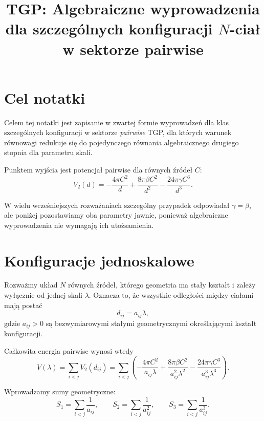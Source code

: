 \documentclass[11pt,a4paper]{article}
\title{TGP: Algebraiczne wyprowadzenia dla szczególnych konfiguracji \texorpdfstring{$N$}{N}-ciał w sektorze pairwise}
\author{}
\date{}
\theoremstyle{plain}
\theoremstyle{remark}
\begin{document}
\maketitle

\section{Cel notatki}

Celem tej notatki jest zapisanie w zwartej formie wyprowadzeń dla klas szczególnych konfiguracji w sektorze \emph{pairwise} TGP, dla których warunek równowagi redukuje się do pojedynczego równania algebraicznego drugiego stopnia dla parametru skali.

Punktem wyjścia jest potencjał pairwise dla równych źródeł $C$:
\begin{equation}
V_2(d) = -\frac{4\pi C^2}{d} + \frac{8\pi \beta C^2}{d^2} - \frac{24\pi \gamma C^3}{d^3}.
\end{equation}

W wielu wcześniejszych rozważaniach szczególny przypadek odpowiadał $\gamma = \beta$, ale poniżej pozostawiamy oba parametry jawnie, ponieważ algebraiczne wyprowadzenia nie wymagają ich utożsamienia.

\section{Konfiguracje jednoskalowe}

Rozważmy układ $N$ równych źródeł, którego geometria ma stały kształt i zależy wyłącznie od jednej skali $\lambda$. Oznacza to, że wszystkie odległości między ciałami mają postać
\begin{equation}
d_{ij} = a_{ij} \lambda,
\end{equation}
 gdzie $a_{ij} > 0$ są bezwymiarowymi stałymi geometrycznymi określającymi kształt konfiguracji.

Całkowita energia pairwise wynosi wtedy
\begin{equation}
V(\lambda) = \sum_{i<j} V_2(d_{ij})
= \sum_{i<j} \left(
-\frac{4\pi C^2}{a_{ij}\lambda}
+ \frac{8\pi\beta C^2}{a_{ij}^2\lambda^2}
- \frac{24\pi\gamma C^3}{a_{ij}^3\lambda^3}
\right).
\end{equation}

Wprowadzamy sumy geometryczne:
\begin{equation}
S_1 = \sum_{i<j}\frac{1}{a_{ij}},
\qquad
S_2 = \sum_{i<j}\frac{1}{a_{ij}^2},
\qquad
S_3 = \sum_{i<j}\frac{1}{a_{ij}^3}.
\end{equation}
\end{document}
